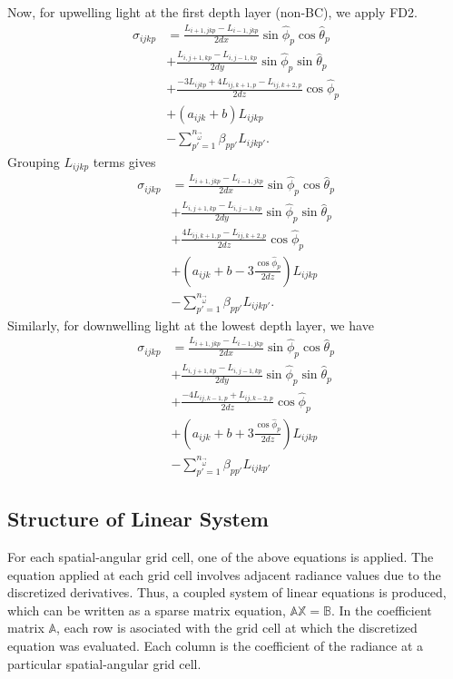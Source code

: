 Now, for upwelling light at the first depth layer (non-BC), we apply FD2.
\begin{equation*}
  \begin{aligned}
    \sigma_{ijkp} &= \frac{L_{i+1,jkp}-L_{i-1,jkp}}{2dx}\sin\hat{\phi}_p\cos\hat{\theta}_p \\
    &+ \frac{L_{i,j+1,kp}-L_{i,j-1,kp}}{2dy}\sin\hat{\phi}_p\sin\hat{\theta}_p \\
    &+ \frac{-3L_{ijkp} + 4L_{ij,k+1,p} - L_{ij,k+2,p}}{2dz}\cos\hat{\phi}_p \\
    &+ (a_{ijk}+b)L_{ijkp} \\
    &- \sum_{p'=1}^{n_{\vec{\omega}}} \beta_{pp'} L_{ijkp'}.
  \end{aligned}
\end{equation*}
Grouping $L_{ijkp}$ terms gives
\begin{equation*}
  \begin{aligned}
    \sigma_{ijkp} &= \frac{L_{i+1,jkp}-L_{i-1,jkp}}{2dx}\sin\hat{\phi}_p\cos\hat{\theta}_p \\
    &+ \frac{L_{i,j+1,kp}-L_{i,j-1,kp}}{2dy}\sin\hat{\phi}_p\sin\hat{\theta}_p \\
    &+ \frac{4L_{ij,k+1,p} - L_{ij,k+2,p}}{2dz}\cos\hat{\phi}_p \\
    &+ \left(a_{ijk}+b - 3\frac{\cos\hat\phi_p}{2dz} \right)L_{ijkp} \\
    &- \sum_{p'=1}^{n_{\vec{\omega}}} \beta_{pp'} L_{ijkp'}.
  \end{aligned}
\end{equation*}
Similarly, for downwelling light at the lowest depth layer, we have
\begin{equation*}
  \begin{aligned}
    \sigma_{ijkp} &= \frac{L_{i+1,jkp}-L_{i-1,jkp}}{2dx}\sin\hat{\phi}_p\cos\hat{\theta}_p \\
    &+ \frac{L_{i,j+1,kp}-L_{i,j-1,kp}}{2dy}\sin\hat{\phi}_p\sin\hat{\theta}_p \\
    &+ \frac{-4L_{ij,k-1,p} + L_{ij,k-2,p}}{2dz}\cos\hat{\phi}_p \\
    &+ \left(a_{ijk}+b + 3\frac{\cos\hat\phi_p}{2dz} \right)L_{ijkp} \\
    &- \sum_{p'=1}^{n_{\vec{\omega}}} \beta_{pp'} L_{ijkp'}
  \end{aligned}
\end{equation*}

\subsection{Structure of Linear System}
For each spatial-angular grid cell, one of the above equations is applied.
The equation applied at each grid cell involves adjacent radiance values due to the discretized derivatives.
Thus, a coupled system of linear equations is produced, which can be written as a sparse matrix equation, $\mathbb{AX=B}$.
In the coefficient matrix $\mathbb{A}$, each row is asociated with the grid cell at which the discretized equation was evaluated.
Each column is the coefficient of the radiance at a particular spatial-angular grid cell.

